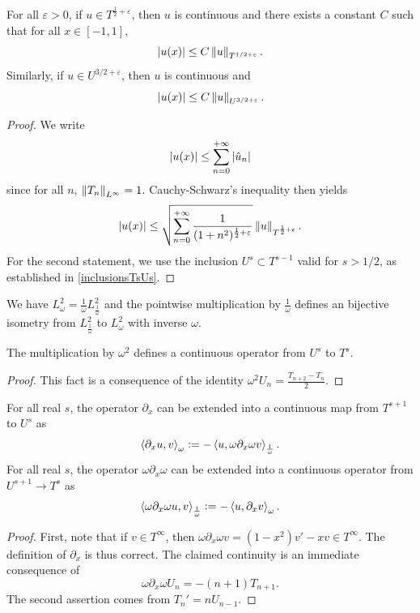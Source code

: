 \documentclass[a4paper]{article}
\begin{document}
\begin{Lem}
	\label{LemInjectionsContinues}
	For all $\varepsilon >0$, if $u \in T^{\frac{1}{2} + \varepsilon}$, then $u$ is continuous and there exists a constant $C$ such that for all $x \in [-1,1]$,
	\[ \left\lvert u(x) \right\rvert \leq C \left\|u\right\|_{T^{1/2 + \varepsilon}}.\]	
	Similarly, if $u \in U^{3/2 + \varepsilon}$, then $u$ is continuous and 
	\[ \left\lvert u(x) \right\rvert \leq C \left\|u\right\|_{U^{3/2 + \varepsilon}}.\]
\end{Lem}
\begin{proof}
	We write 
	\[\left\lvert u(x) \right\rvert \leq \sum_{n = 0}^{+ \infty} \left\lvert \hat{u}_n \right\rvert\]
	since for all $n$, $\left\|T_n\right\|_{L^\infty} = 1$. Cauchy-Schwarz's inequality then yields
	\[\left\lvert u(x) \right\rvert \leq \sqrt{\sum_{n= 0}^{+ \infty} \frac{1}{(1+ n^2)^{\frac{1}{2}+ \varepsilon}}} \left\|u\right\|_{T^{\frac{1}{2} + \varepsilon}}.\]
	For the second statement, we use the inclusion $U^{s} \subset T^{s-1}$ valid for $s > 1/2$, as established in \autoref{inclusionsTsUs}. 
\end{proof}	
\begin{Lem}
	We have $L^2_\omega = \frac{1}{\omega}L^2_\frac{1}{\omega}$ and the pointwise multiplication by $\frac{1}{\omega}$ defines an bijective isometry from $L^2_\frac{1}{\omega}$ to $L^2_\omega$ with inverse $\omega$. 
	\label{isometrie}
\end{Lem}
\begin{Lem}
	\label{omega2continuUsTs}
	The multiplication by $\omega^2$ defines a continuous operator from $U^s$ to $T^s$. 
\end{Lem}
\begin{proof}
	This fact is a consequence of the identity $\omega^2 U_n = \frac{T_{n+2} - T_{n}}{2}$. 
\end{proof}
\begin{Lem}
	\label{derivations}
	For all real $s$, the operator $\partial_x$ can be extended into a continuous map from $T^{s+1}$ to $U^{s}$ as
	\[ \left\langle \partial_x u,v\right\rangle_{\omega} \mathrel{\mathop:}= -\left\langle u,\omega \partial_x \omega v\right\rangle_{\frac{1}{\omega}}.\] 
	For all real $s$, the  operator $\omega \partial_x \omega$ can be extended into a continuous operator from $U^{s+1} \to T^{s}$ as
	\[\left\langle \omega \partial_x \omega u,v\right\rangle_\frac{1}{\omega} \mathrel{\mathop:}= -\left\langle u,\partial_x v\right\rangle_\omega.\]
	
\end{Lem}
\begin{proof}
	First, note that if $v \in T^{\infty}$, then  $\omega \partial_x \omega v = (1-x^2)v' - xv \in T^{\infty}$. The definition of $\partial_x$ is thus correct. The claimed continuity  is an immediate consequence of 
	\[\omega \partial_x \omega U_n = -(n+1) T_{n+1}.\]
	The second assertion comes from $T_n' = nU_{n-1}$. 
\end{proof}
\end{document}
